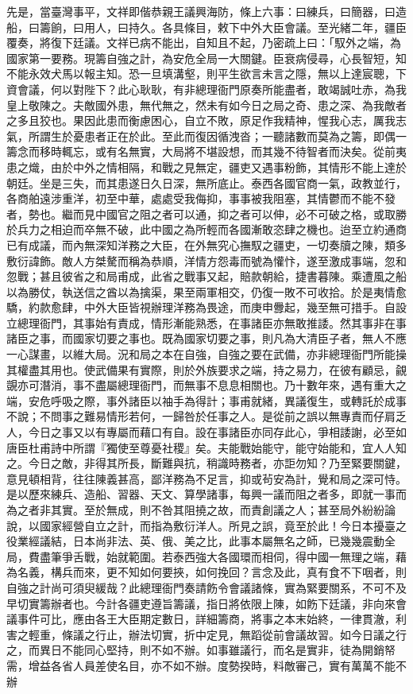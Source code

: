 \begin{pinyinscope}
先是，當臺灣事平，文祥即偕恭親王議興海防，條上六事：曰練兵，曰簡器，曰造船，曰籌餉，曰用人，曰持久。各具條目，敕下中外大臣會議。至光緒二年，疆臣覆奏，將復下廷議。文祥已病不能出，自知且不起，乃密疏上曰：「馭外之端，為國家第一要務。現籌自強之計，為安危全局一大關鍵。臣衰病侵尋，心長智短，知不能永效犬馬以報主知。恐一旦填溝壑，則平生欲言未言之隱，無以上達宸聰，下資會議，何以對陛下？此心耿耿，有非總理衙門原奏所能盡者，敢竭誠吐赤，為我皇上敬陳之。夫敵國外患，無代無之，然未有如今日之局之奇、患之深、為我敵者之多且狡也。果因此患而衡慮困心，自立不敗，原足作我精神，惺我心志，厲我志氣，所謂生於憂患者正在於此。至此而復因循洩沓；一聽諸數而莫為之籌，即偶一籌念而移時輒忘，或有名無實，大局將不堪設想，而其幾不待智者而決矣。從前夷患之熾，由於中外之情相隔，和戰之見無定，疆吏又遇事粉飾，其情形不能上達於朝廷。坐是三失，而其患遂日久日深，無所底止。泰西各國官商一氣，政教並行，各商舶遠涉重洋，初至中華，處處受我侮抑，事事被我阻塞，其情鬱而不能不發者，勢也。繼而見中國官之阻之者可以通，抑之者可以伸，必不可破之格，或取勝於兵力之相迫而卒無不破，此中國之為所輕而各國漸敢恣肆之機也。迨至立約通商已有成議，而內無深知洋務之大臣，在外無究心撫馭之疆吏，一切奏牘之陳，類多敷衍諱飾。敵人方桀驁而稱為恭順，洋情方怨毒而號為懽忭，遂至激成事端，忽和忽戰；甚且彼省之和局甫成，此省之戰事又起，賠款朝給，捷書暮陳。乘遭風之船以為勝仗，執送信之酋以為擒渠，果至兩軍相交，仍復一敗不可收拾。於是夷情愈驕，約款愈肆，中外大臣皆視辦理洋務為畏途，而庚申釁起，幾至無可措手。自設立總理衙門，其事始有責成，情形漸能熟悉，在事諸臣亦無敢推諉。然其事非在事諸臣之事，而國家切要之事也。既為國家切要之事，則凡為大清臣子者，無人不應一心謀畫，以維大局。況和局之本在自強，自強之要在武備，亦非總理衙門所能操其權盡其用也。使武備果有實際，則於外族要求之端，持之易力，在彼有顧忌，覦覬亦可潛消，事不盡屬總理衙門，而無事不息息相關也。乃十數年來，遇有重大之端，安危呼吸之際，事外諸臣以袖手為得計；事甫就緒，異議復生，或轉託於成事不說；不問事之難易情形若何，一歸咎於任事之人。是從前之誤以無專責而仔肩乏人，今日之事又以有專屬而藉口有自。設在事諸臣亦同存此心，爭相諉謝，必至如唐臣杜甫詩中所謂『獨使至尊憂社稷』矣。夫能戰始能守，能守始能和，宜人人知之。今日之敵，非得其所長，斷難與抗，稍識時務者，亦詎勿知？乃至緊要關鍵，意見頓相背，往往陳義甚高，鄙洋務為不足言，抑或茍安為計，覺和局之深可恃。是以歷來練兵、造船、習器、天文、算學諸事，每興一議而阻之者多，即就一事而為之者非其實。至於無成，則不咎其阻撓之故，而責創議之人；甚至局外紛紛論說，以國家經營自立之計，而指為敷衍洋人。所見之誤，竟至於此！今日本擾臺之役業經議結，日本尚非法、英、俄、美之比，此事本屬無名之師，已幾幾震動全局，費盡筆爭舌戰，始就範圍。若泰西強大各國環而相伺，得中國一無理之端，藉為名義，構兵而來，更不知如何要挾，如何挽回？言念及此，真有食不下咽者，則自強之計尚可須臾緩哉？此總理衙門奏請飭令會議諸條，實為緊要關系，不可不及早切實籌辦者也。今計各疆吏遵旨籌議，指日將依限上陳，如飭下廷議，非向來會議事件可比，應由各王大臣期定數日，詳細籌商，將事之本末始終，一律貫澈，利害之輕重，條議之行止，辦法切實，折中定見，無蹈從前會議故習。如今日議之行之，而異日不能同心堅持，則不如不辦。如事雖議行，而名是實非，徒為開銷帑需，增益各省人員差使名目，亦不如不辦。度勢揆時，料敵審己，實有萬萬不能不辦
\end{pinyinscope}
